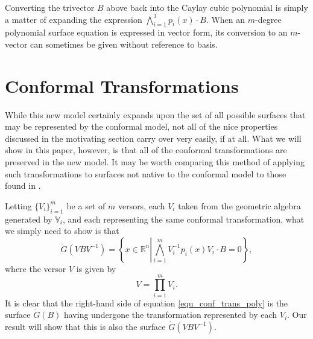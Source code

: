 \documentclass{birkjour}
\theoremstyle{definition}
\theoremstyle{remark}
\numberwithin{equation}{section}
\newcommand{\R}{\mathbb{R}}
\newcommand{\V}{\mathbb{V}}
\newcommand{\Gd}{\dot{G}}
\begin{document}
Converting the trivector $B$ above back into the Caylay cubic polynomial is simply a matter
of expanding the expression $\bigwedge_{i=1}^3 p_i(x)\cdot B$.
When an $m$-degree polynomial surface equation is expressed in vector form, its conversion to an $m$-vector
can sometimes be given without reference to basis.

\section{Conformal Transformations}

While this new model certainly expands upon the set of all possible surfaces that may
be represented by
the conformal model, not all of the nice properties discussed in the motivating section
carry over very easily, if at all.
What we will show in this paper, however, is that all of the conformal transformations
are preserved in the new model.  It may be worth comparing this method
of applying such transformations to surfaces not native to the conformal model
to those found in \cite{Sobczyk12,Lasenby05}.

Letting $\{V_i\}_{i=1}^m$ be a set of $m$ versors, each $V_i$ taken from the
geometric algebra generated by $\V_i$, and each representing the same
conformal transformation, what we simply need to show is that
\begin{equation}\label{equ_conf_trans_poly}
\Gd(VBV^{-1}) = \left\{x\in\R^n\left|\bigwedge_{i=1}^m V_i^{-1}p_i(x)V_i\cdot B=0\right\}\right.,
\end{equation}
where the versor $V$ is given by
\begin{equation*}
V = \prod_{i=1}^m V_i.
\end{equation*}
It is clear that the right-hand side of equation \eqref{equ_conf_trans_poly} is
the surface $\Gd(B)$ having undergone the transformation represented by each $V_i$.
Our result will show that this is also the surface $\Gd(VBV^{-1})$.
\end{document}
